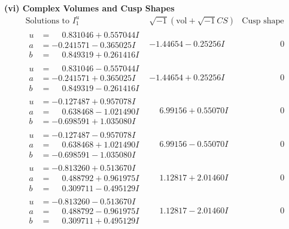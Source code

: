 \documentclass[1p]{elsarticle_modified}
\theoremstyle{definition}
\newcommand{\I}{\sqrt{-1}}
\begin{document}
\newpage\flushleft \textbf{(vi) Complex Volumes and Cusp Shapes}
$$\begin{array}{c|c|c}  
\text{Solutions to }I^u_{1}& \I (\text{vol} + \sqrt{-1}CS) & \text{Cusp shape}\\
 \hline 
\begin{aligned}
u &= \phantom{-}0.831046 + 0.557044 I \\
a &= -0.241571 - 0.365025 I \\
b &= \phantom{-}0.849319 + 0.261416 I\end{aligned}
 & -1.44654 - 0.25256 I & \phantom{-0.000000 } 0 \\ \hline\begin{aligned}
u &= \phantom{-}0.831046 - 0.557044 I \\
a &= -0.241571 + 0.365025 I \\
b &= \phantom{-}0.849319 - 0.261416 I\end{aligned}
 & -1.44654 + 0.25256 I & \phantom{-0.000000 } 0 \\ \hline\begin{aligned}
u &= -0.127487 + 0.957078 I \\
a &= \phantom{-}0.638468 - 1.021490 I \\
b &= -0.698591 + 1.035080 I\end{aligned}
 & \phantom{-}6.99156 + 0.55070 I & \phantom{-0.000000 } 0 \\ \hline\begin{aligned}
u &= -0.127487 - 0.957078 I \\
a &= \phantom{-}0.638468 + 1.021490 I \\
b &= -0.698591 - 1.035080 I\end{aligned}
 & \phantom{-}6.99156 - 0.55070 I & \phantom{-0.000000 } 0 \\ \hline\begin{aligned}
u &= -0.813260 + 0.513670 I \\
a &= \phantom{-}0.488792 + 0.961975 I \\
b &= \phantom{-}0.309711 - 0.495129 I\end{aligned}
 & \phantom{-}1.12817 + 2.01460 I & \phantom{-0.000000 } 0 \\ \hline\begin{aligned}
u &= -0.813260 - 0.513670 I \\
a &= \phantom{-}0.488792 - 0.961975 I \\
b &= \phantom{-}0.309711 + 0.495129 I\end{aligned}
 & \phantom{-}1.12817 - 2.01460 I & \phantom{-0.000000 } 0 \\ \hline\begin{aligned}

\end{aligned}
\end{array}$$
\end{document}
